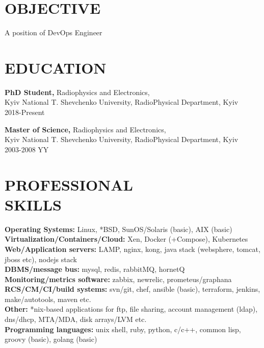 \documentclass[mymargin,10pt]{res} %
\begin{document}
\begin{resume}


\section{OBJECTIVE}

A position of DevOps Engineer


\section{EDUCATION}

{\bf PhD Student,} Radiophysics and Electronics, \\
Kyiv National T. Shevchenko University, RadioPhysical Department, Kyiv \\
2018-Present

{\bf Master of Science,} Radiophysics and Electronics, \\
Kyiv National T. Shevchenko University, RadioPhysical Department, Kyiv \\
2003-2008 YY


\section{PROFESSIONAL \\ SKILLS}

{\bf Operating Systems:} Linux, *BSD, SunOS/Solaris (basic), AIX (basic) \\
{\bf Virtualization/Containers/Cloud:} Xen, Docker (+Compose), Kubernetes \\
{\bf Web/Application servers:} LAMP, nginx, kong, java stack (websphere, tomcat, jboss etc), nodejs stack \\
{\bf DBMS/message bus:} mysql, redis, rabbitMQ, hornetQ \\
{\bf Monitoring/metrics software:}  zabbix, newrelic, prometeus/graphana \\
{\bf RCS/CM/CI/build systems:} svn/git, chef, ansible (basic), terraform, jenkins, make/autotools, maven etc. \\
{\bf Other:} *nix-based applications for ftp, file sharing, account management (ldap), dns/dhcp, MTA/MDA, disk arrays/LVM etc. \\
{\bf Programming languages:} unix shell, ruby, python, c/c++, common lisp, groovy (basic), golang (basic) \\


\end{resume}
\end{document}
